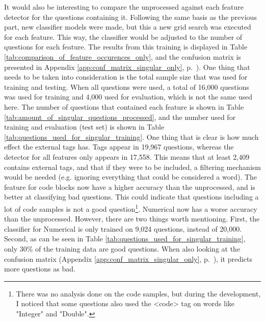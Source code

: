 \vspace{0.5em}\newline
It would also be interesting to compare the unprocessed against each feature detector for the questions containing it.
Following the same basis as the previous part, new classifier models were made, but this a new grid search was executed for each feature. 
This way, the classifier would be adjusted to the number of questions for each feature. 
The results from this training is displayed in Table \ref{tab:comparison_of_feature_occurences_only}, and the confusion matrix is presented in Appendix \ref{app:conf_matrix_singular_only}, 
p.~\pageref{app:conf_matrix_singular_only}). 
One thing that needs to be taken into consideration is the total sample size that was used for training and testing. 
When all questions were used, a total of 16,000 questions was used for training and 4,000 used for evaluation, which is not the same used here.
The number of questions that contained each feature is shown in Table \ref{tab:amount_of_singular_questions_processed}, and the number used for training and evaluation (test set) 
is shown in Table \ref{tab:questions_used_for_singular_training}.
\vspace{0.5em}\newline
One thing that is clear is how much effect the external tags has. Tags appear in 19,967 questions, whereas the detector for all features only appears in 17,558.
This means that at least 2,409 contains external tags, and that if they were to be included, a filtering mechanism would be needed (e.g. ignoring everything that could be considered a word).
The feature for code blocks now have a higher accuracy than the unprocessed, and is better at classifying bad questions. 
This could indicate that questions including a lot of code samples is not a good question\footnote{
	There was no analysis done on the code samples, but during the development, I noticed that some questions also used the <code> tag on words like "Integer" and "Double".
}.
Numerical now has a worse accuracy than the unprocessed.
However, there are two things worth mentioning. 
First, the classifier for Numerical is only trained on 9,024 questions, instead of 20,000.
Second, as can be seen in Table \ref{tab:questions_used_for_singular_training}, only 30\% of the training data are good questions. 
When also looking at the confusion matrix (Appendix \ref{app:conf_matrix_singular_only}, p.~\pageref{app:conf_matrix_singular_only}), it predicts more questions as bad.
